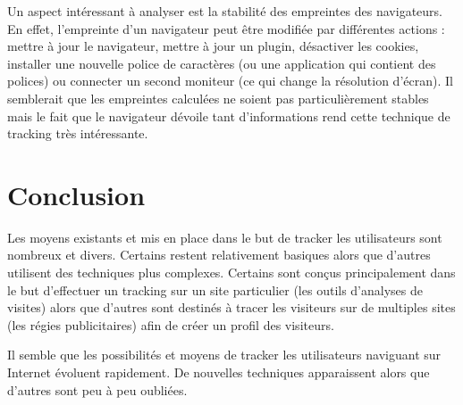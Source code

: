 Un aspect intéressant à analyser est la stabilité des empreintes des navigateurs. En effet, l'empreinte d'un navigateur peut être modifiée par différentes actions : mettre à jour le navigateur, mettre à jour un plugin, désactiver les cookies, installer une nouvelle police de caractères (ou une application qui contient des polices) ou connecter un second moniteur (ce qui change la résolution d'écran). Il semblerait que les empreintes calculées ne soient pas particulièrement stables mais le fait que le navigateur dévoile tant d'informations rend cette technique de tracking très intéressante. \cite{Eckersley:2010:UYW:1881151.1881152}

\section{Conclusion}
Les moyens existants et mis en place dans le but de tracker les utilisateurs sont nombreux et divers. Certains restent relativement basiques alors que d'autres utilisent des techniques plus complexes. Certains sont conçus principalement dans le but d'effectuer un tracking sur un site particulier (les outils d'analyses de visites) alors que d'autres sont destinés à tracer les visiteurs sur de multiples sites (les régies publicitaires) afin de créer un profil des visiteurs.

Il semble que les possibilités et moyens de tracker les utilisateurs naviguant sur Internet évoluent rapidement. De nouvelles techniques apparaissent alors que d'autres sont peu à peu oubliées.
